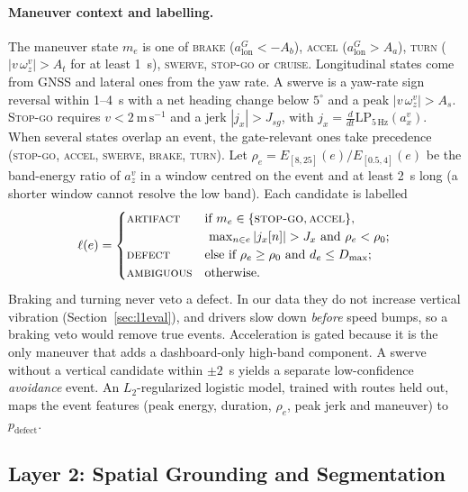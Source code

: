 \paragraph{Maneuver context and labelling.}
The maneuver state $m_e$ is one of \textsc{brake} ($a^G_{\mathrm{lon}}<-A_b$), \textsc{accel} ($a^G_{\mathrm{lon}}>A_a$), \textsc{turn} ($|v\,\omega^v_z|>A_t$ for at least 1~s), \textsc{swerve}, \textsc{stop-go} or \textsc{cruise}.
Longitudinal states come from GNSS and lateral ones from the yaw rate.
A swerve is a yaw-rate sign reversal within 1--4~s with a net heading change below $5^\circ$ and a peak $|v\,\omega^v_z|>A_s$.
\textsc{Stop-go} requires $v<2~\mathrm{m\,s^{-1}}$ and a jerk $|j_x|>J_{sg}$, with $j_x=\tfrac{d}{dt}\mathrm{LP}_{5\,\mathrm{Hz}}(a^v_x)$.
When several states overlap an event, the gate-relevant ones take precedence (\textsc{stop-go}, \textsc{accel}, \textsc{swerve}, \textsc{brake}, \textsc{turn}).
Let $\rho_e=E_{[8,25]}(e)/E_{[0.5,4]}(e)$ be the band-energy ratio of $a^v_z$ in a window centred on the event and at least 2~s long (a shorter window cannot resolve the low band).
Each candidate is labelled
\begin{equation}
\ell(e)=
\begin{cases}
\text{\textsc{artifact}} & \text{if } m_e\in\{\text{\textsc{stop-go}},\text{\textsc{accel}}\},\\
 & \ \max_{n\in e}|j_x[n]|>J_x \text{ and } \rho_e<\rho_0;\\
\text{\textsc{defect}} & \text{else if } \rho_e\ge\rho_0 \text{ and } d_e\le D_{\max};\\
\text{\textsc{ambiguous}} & \text{otherwise}.
\end{cases}
\label{eq:gate}
\end{equation}
Braking and turning never veto a defect.
In our data they do not increase vertical vibration (Section~\ref{sec:l1eval}), and drivers slow down \emph{before} speed bumps, so a braking veto would remove true events.
Acceleration is gated because it is the only maneuver that adds a dashboard-only high-band component.
A swerve without a vertical candidate within $\pm2$~s yields a separate low-confidence \emph{avoidance} event.
An $L_2$-regularized logistic model, trained with routes held out, maps the event features (peak energy, duration, $\rho_e$, peak jerk and maneuver) to $p_{\mathrm{defect}}$.

\subsection{Layer 2: Spatial Grounding and Segmentation}
\label{sec:layer2}

